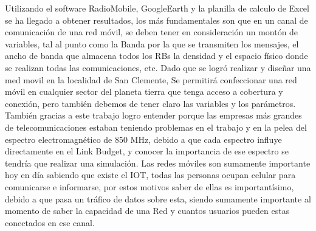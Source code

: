 \documentclass[Article, letterpaper,12pt]{article}
\begin{document}
Utilizando el software RadioMobile, GoogleEarth y la planilla de calculo de Excel se ha llegado a obtener resultados, los más fundamentales son que en un canal de comunicación de una red móvil, se deben tener en consideración un montón de variables, tal al punto como la Banda por la que se transmiten los mensajes, el ancho de banda que almacena todos los RBs la densidad y el espacio físico donde se realizan todas las comunicaciones, etc.
Dado que se logró realizar y diseñar una med movil en la localidad de San Clemente, Se permitirá confeccionar una red móvil en cualquier sector del planeta tierra que tenga acceso a cobertura y conexión, pero también debemos de tener claro las variables y los parámetros. También gracias a este trabajo logro entender porque las empresas más grandes de telecomunicaciones estaban teniendo problemas en el trabajo y en la pelea del espectro electromagnético de 850 MHz, debido a que cada espectro influye directamente en el Link Budget, y conocer la importancia de ese espectro se tendría que realizar una simulación. 
Las redes móviles son sumamente importante hoy en día sabiendo que existe el IOT, todas las personas ocupan celular para comunicarse e informarse, por estos motivos saber de ellas es importantísimo, debido a que pasa un tráfico de datos sobre esta, siendo sumamente importante al momento de saber la capacidad de una Red y cuantos usuarios pueden estas conectados en ese canal.
\end{document}
